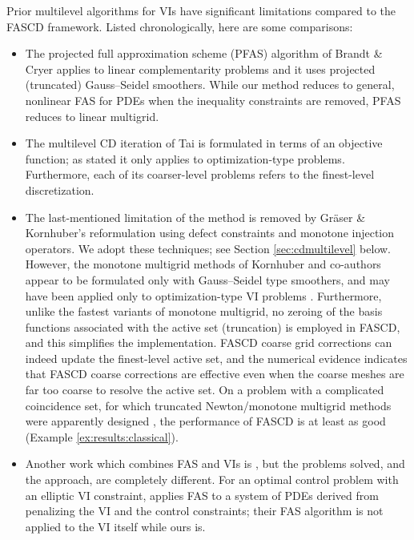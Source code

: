 \documentclass[review,hidelinks,onefignum,onetabnum,final]{siamart220329}  %
\begin{document}
Prior multilevel algorithms for VIs have significant limitations compared to the FASCD framework.  Listed chronologically, here are some comparisons:
\begin{itemize}
\item The projected full approximation scheme (PFAS) algorithm of Brandt \& Cryer \cite{BrandtCryer1983} applies to linear complementarity problems and it uses projected (truncated) Gauss--Seidel smoothers.  While our method reduces to general, nonlinear FAS for PDEs when the inequality constraints are removed, PFAS reduces to linear multigrid.
\item The multilevel CD iteration of Tai \cite{Tai2003} is formulated in terms of an objective function; as stated it only applies to optimization-type problems.  Furthermore, each of its coarser-level problems refers to the finest-level discretization.
\item The last-mentioned limitation of the \cite{Tai2003} method is removed by Gr\"aser \& Kornhuber's \cite[Algorithm 4.2]{GraeserKornhuber2009} reformulation using defect constraints and monotone injection operators.  We adopt these techniques; see Section \ref{sec:cdmultilevel} below.  However, the monotone multigrid methods of Kornhuber and co-authors \cite{GraeserKornhuber2009,Kornhuber1994} appear to be formulated only with Gauss--Seidel type smoothers, and may have been applied only to optimization-type VI problems \cite[for example]{JouvetGraeser2013}.  Furthermore, unlike the fastest variants of monotone multigrid, no zeroing of the basis functions associated with the active set (truncation) is employed in FASCD, and this simplifies the implementation.  FASCD coarse grid corrections can indeed update the finest-level active set, and the numerical evidence indicates that FASCD coarse corrections are effective even when the coarse meshes are far too coarse to resolve the active set.  On a problem with a complicated coincidence set, for which truncated Newton/monotone multigrid methods were apparently designed \cite[problem 7.1.1]{GraeserKornhuber2009}, the performance of FASCD is at least as good (Example \ref{ex:results:classical}).
\item Another work which combines FAS and VIs is \cite{HintermullerKopacka2011}, but the problems solved, and the approach, are completely different.  For an optimal control problem with an elliptic VI constraint, \cite{HintermullerKopacka2011} applies FAS to a system of PDEs derived from penalizing the VI and the control constraints; their FAS algorithm is not applied to the VI itself while ours is.
\end{itemize}
\end{document}
